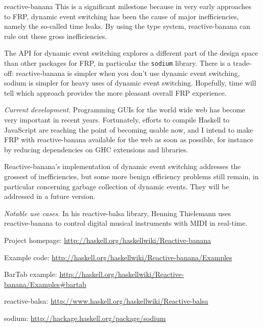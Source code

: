 \begin{hcarentry}[updated]{reactive-banana}
This is a significant milestone because in very early approaches to FRP, dynamic event switching has been the cause of major inefficiencies, namely the so-called time leaks. By using the type system, reactive-banana can rule out these gross inefficiencies.

The API for dynamic event switching explores a different part of the design space than other packages for FRP, in particular the \verb!sodium! library. There is a trade-off: reactive-banana is simpler when you don't use dynamic event switching, sodium is simpler for heavy uses of dynamic event switching. Hopefully, time will tell which approach provides the more pleasant overall FRP experience.

\emph{Current development.}
Programming GUIs for the world wide web has become very important in recent years. Fortunately, efforts to compile Haskell to JavaScript are reaching the point of becoming usable now, and I intend to make FRP with reactive-banana available for the web as soon as possible, for instance by reducing dependencies on GHC extensions and libraries.

Reactive-banana's implementation of dynamic event switching addresses the grossest of inefficiencies, but some more benign efficiency problems still remain, in particular concerning garbage collection of dynamic events. They will be addressed in a future version.

\emph{Notable use cases.} In his reactive-balsa library, Henning Thielemann uses reactive-banana to control digital musical instruments with MIDI in real-time.

\FurtherReading
\begin{compactitem}
\item Project homepage: \url{http://haskell.org/haskellwiki/Reactive-banana}
\item Example code: \url{http://haskell.org/haskellwiki/Reactive-banana/Examples}
\item BarTab example: \url{http://haskell.org/haskellwiki/Reactive-banana/Examples#bartab}
\item reactive-balsa: \url{http://www.haskell.org/haskellwiki/Reactive-balsa}
\item sodium: \url{http://hackage.haskell.org/package/sodium}
\end{compactitem}
\end{hcarentry}

